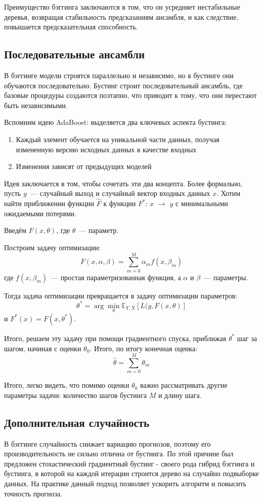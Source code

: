 Преимущество бэггинга заключаются в том, что он усредняет нестабильные деревья, возвращая стабильность предсказаниям ансамбля, и как следствие, повышается предсказательная способность.

\subsection*{Последовательные ансамбли}
В бэггинге модели строятся параллельно и независимо, но в бустинге они обучаются последовательно. Бустинг строит последовательный ансамбль, где базовые процедуры создаются поэтапно, что приводит к тому, что они перестают быть независимыми.

Вспомним идею AdaBoost: выделяется два ключевых аспекта бустинга:
\begin{enumerate}
    \item Каждый элемент обучается на уникальной части данных, получая измененную версию исходных данных в качестве входных 
    \item Изменения зависят от предыдущих моделей
\end{enumerate}

Идея заключается в том, чтобы сочетать эти два концепта. Более формально, пусть $y$~--- случайный выход и случайный вектор входных данных $x$.
Хотим найти приближении функции $\hat{F}$ к функции $F^*$: $x$ $\rightarrow$ $y$ с минимальными ожидаемыми потерями.

Введём $F(x, \theta)$, где $\theta$~--- параметр.

Построим задачу оптимизации:
$$F(x, \alpha, \beta) = \sum_{m = 0}^M \alpha_m f(x, \beta_m)$$ где $f(x, \beta_m)$~--- простая параметризованная функция, а $\alpha$ и $\beta$~--- параметры.

Тогда задача оптимизации превращается в задачу оптимизации параметров:
$$\theta^* = \arg \min_{\theta} \mathbb{E}_{Y, X} [L(y, F(x, \theta)]$$
и $F^*(x)=F(x, \theta^*)$.

Итого, решаем эту задачу при помощи градиентного спуска, приближая $\theta^*$ шаг за шагом, начиная с оценки $\theta_0$. Итого, по итогу конечная оценка:
$$\hat{\theta} = \sum_{m=0}^M \theta_m$$

Итого, легко видеть, что помимо оценки $\theta_0$ важно рассматривать другие параметры задачи: количество шагов бустинга $M$ и длину шага.

\subsection*{Дополнительная случайность}
В бэггинге случайность снижает вариацию прогнозов, поэтому его производительность не сильно отлична от бустинга. По этой причине был предложен стохастический градиентный бустинг - своего рода гибрид бэггинга и бустинга, в которой на каждой итерации строится дерево на случайно подвыборке данных. На практике данный подход позволяет ускорить алгоритм и повысить точность прогноза.


